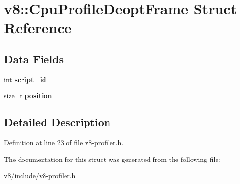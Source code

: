 \hypertarget{structv8_1_1CpuProfileDeoptFrame}{}\section{v8\+:\+:Cpu\+Profile\+Deopt\+Frame Struct Reference}
\label{structv8_1_1CpuProfileDeoptFrame}
\subsection*{Data Fields}
\begin{DoxyCompactItemize}
\item 
\mbox{\label{structv8_1_1CpuProfileDeoptFrame_af7b750288458a70a81b4c05869b8f6d7}} 
int {\bfseries script\+\_\+id}
\item 
\mbox{\label{structv8_1_1CpuProfileDeoptFrame_a4f82d1517fd15573bb2890961496a76f}} 
size\+\_\+t {\bfseries position}
\end{DoxyCompactItemize}


\subsection{Detailed Description}


Definition at line 23 of file v8-\/profiler.\+h.



The documentation for this struct was generated from the following file\+:\begin{DoxyCompactItemize}
\item 
v8/include/v8-\/profiler.\+h\end{DoxyCompactItemize}

